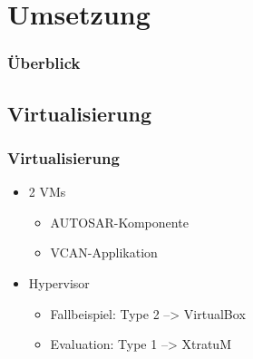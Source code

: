 \documentclass[]{beamer}
\newcommand{\inputImage}[1]{}
\begin{document}
\section{Umsetzung}
\label{sec:umsetzung}

\begin{frame}
\frametitle{Überblick}
    \begin{figure}[ht]
        \centering
        \resizebox{0.8\linewidth}{!}{\inputImage{arch_finished.dia}}
        \label{fig:arch_finished}
    \end{figure}
\end{frame}




\subsection{Virtualisierung}
\begin{frame}
\frametitle{Virtualisierung}
    \begin{itemize}
        \item 2 VMs
        \begin{itemize}
            \item AUTOSAR-Komponente
            \item VCAN-Applikation
        \end{itemize}
        \item Hypervisor
        \begin{itemize}
            \item Fallbeispiel: Type 2 --> VirtualBox
            \item Evaluation: Type 1 --> XtratuM
        \end{itemize}
    \end{itemize}
\end{frame}




\end{document}
